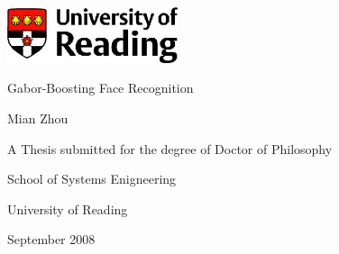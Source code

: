 \begin{titlepage}
\begin{center}
\includegraphics[width=5cm]{UoRlogo.jpg}
\par
\vfill
{\LARGE Gabor-Boosting Face Recognition}
\par
\vspace{1.5in}
{\large Mian Zhou}
\par
\vfill
A Thesis submitted for the degree of Doctor of Philosophy
\par
\vspace{0.5in}
School of Systems Enigneering
\par
\vspace{0.5in}
University of Reading
\par
\vspace{0.5in}
September 2008
\end{center}
\end{titlepage}